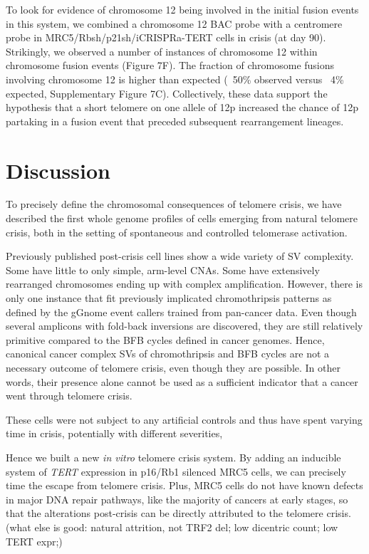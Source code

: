 \documentclass[phd,tocprelim]{cornell}
\begin{document}
To look for evidence of chromosome 12 being involved in the initial fusion events in this system, we combined a chromosome 12 BAC probe with a centromere probe in MRC5/Rbsh/p21sh/iCRISPRa-TERT cells in crisis (at day 90). Strikingly, we observed a number of instances of chromosome 12 within chromosome fusion events (Figure 7F). The fraction of chromosome fusions involving chromosome 12 is higher than expected (~50\% observed versus ~4\% expected, Supplementary Figure 7C). Collectively, these data support the hypothesis that a short telomere on one allele of 12p increased the chance of 12p partaking in a fusion event that preceded subsequent rearrangement lineages.

\section{Discussion}
To precisely define the chromosomal consequences of telomere crisis, we have described the first whole genome profiles of cells emerging from natural telomere crisis, both in the setting of spontaneous and controlled telomerase activation. 

Previously published post-crisis cell lines show a wide variety of SV complexity. Some have little to only simple, arm-level CNAs. Some have extensively rearranged chromosomes ending up with complex amplification. However, there is only one instance that fit previously implicated chromothripsis patterns as defined by the gGnome event callers trained from pan-cancer data. Even though several amplicons with fold-back inversions are discovered, they are still relatively primitive compared to the BFB cycles defined in cancer genomes. Hence, canonical cancer complex SVs of chromothripsis and BFB cycles are not a necessary outcome of telomere crisis, even though they are possible. In other words, their presence alone cannot be used as a sufficient indicator that a cancer went through telomere crisis.

These cells were not subject to any artificial controls and thus have spent varying time in crisis, potentially with different severities,

Hence we built a new \textit{in vitro} telomere crisis system. By adding an inducible system of \textit{TERT} expression in p16/Rb1 silenced MRC5 cells, we can precisely time the escape from telomere crisis. Plus, MRC5 cells do not have known defects in major DNA repair pathways, like the majority of cancers at early stages, so that the alterations post-crisis can be directly attributed to the telomere crisis. (what else is good: natural attrition, not TRF2 del; low dicentric count; low TERT expr;)
\end{document}
